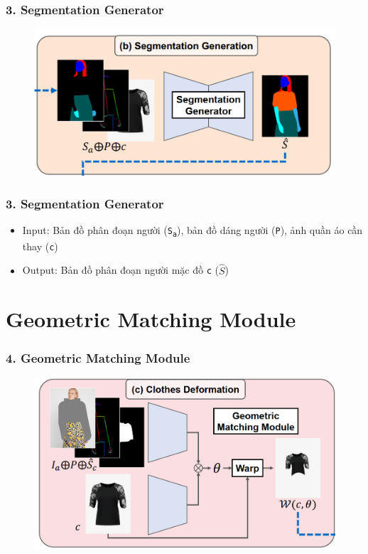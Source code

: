 \documentclass{beamer}
\begin{document}
\begin{frame}
\frametitle{3. Segmentation Generator}

\begin{figure}
    \centering
    \includegraphics[width=1\linewidth]{seg.png}
    
    
\end{figure}

\end{frame}

\begin{frame}
\frametitle{3. Segmentation Generator}
\begin{itemize}
    \item Input: Bản đồ phân đoạn người (\texttt{S\textsubscript{a}}), bản đồ dáng người (\texttt{P}), ảnh quần áo cần thay (\texttt{c}) 
    \item Output: Bản đồ phân đoạn người mặc đồ \texttt{c} ($\hat{S}$)
\end{itemize}

\end{frame}

\section{Geometric Matching Module} 

\begin{frame}
\frametitle{4. Geometric Matching Module}

\begin{figure}
    \centering
    \includegraphics[width=1\linewidth]{gmm.png}
    
    
\end{figure}

\end{frame}
\end{document}
